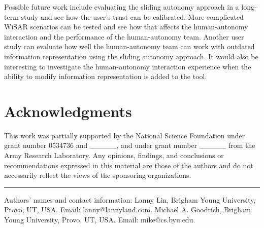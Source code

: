 \documentclass[lettersize, apacite, twoside, HRI]{apa_HRI}
\begin{document}
Possible future work include evaluating the sliding autonomy approach in a long-term study and see how the user's trust can be calibrated. More complicated WiSAR scenarios can be tested and see how that affects the human-autonomy interaction and the performance of the human-autonomy team. Another user study can evaluate how well the human-autonomy team can work with outdated information representation using the sliding autonomy approach. It would also be interesting to investigate the human-autonomy interaction experience when the ability to modify information representation is added to the tool.

\section*{Acknowledgments}

This work was partially supported by 
the National Science Foundation 
under grant number 
0534736 and \_\_\_\_\_, 
and under grant number \_\_\_\_\_ from
the Army Research Laboratory.
Any opinions, findings, and conclusions or recommendations expressed in this material are those of the authors and do not necessarily reflect the views of the sponsoring organizations.



\hrule
\vspace*{.1in}
Authors' names and contact information: Lanny Lin, Brigham Young University, Provo, UT, USA.  Email: lanny@lannyland.com.  Michael A. Goodrich, Brigham Young University, Provo, UT, USA.  Email: mike@cs.byu.edu.
\end{document}
